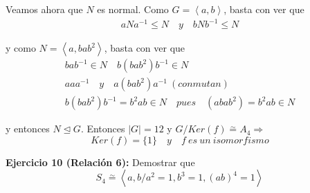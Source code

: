 \documentclass{article}
\begin{document}
\begin{enumerate}[(1)]
Veamos ahora que $N$ es normal. Como $G=\left\langle a,b\right\rangle$, basta con ver que
\begin{gather*}
aNa^{-1}\leq N\quad y\quad bNb^{-1}\leq N
\end{gather*}

y como $N=\left\langle a,bab^2\right\rangle$, basta con ver que
\begin{gather*}
bab^{-1}\in N\quad b(bab^2)b^{-1}\in N\\
aaa^{-1}\quad y\quad a(bab^2)a^{-1}\:(conmutan) \\
b(bab^2)b^{-1}=b^2ab\in N\quad pues\quad (abab^2)=b^2ab\in N
\end{gather*}

y entonces $N\unlhd G$. Entonces $|G|=12$ y $G/Ker(f)\overset{\sim}{=} A_4\Rightarrow$
\begin{equation*}
Ker(f)=\{1\}\quad y\quad f\:es\:un\:isomorfismo
\end{equation*}
\end{enumerate}

\textbf{Ejercicio 10 (Relación 6):} Demostrar que
\begin{equation*}
S_4\overset{\sim}{=} \left\langle a,b/a^2=1,b^3=1,(ab)^4=1\right\rangle
\end{equation*}
\end{document}
